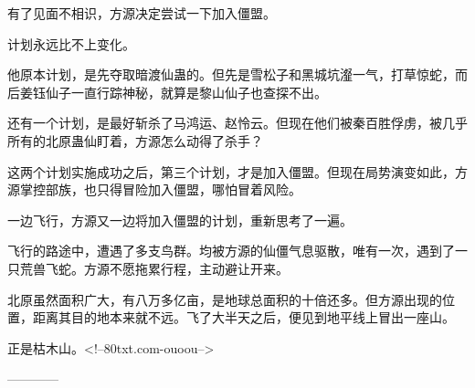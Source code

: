 \begin{this_body}
有了见面不相识，方源决定尝试一下加入僵盟。

计划永远比不上变化。

他原本计划，是先夺取暗渡仙蛊的。但先是雪松子和黑城坑瀣一气，打草惊蛇，而后姜钰仙子一直行踪神秘，就算是黎山仙子也查探不出。

还有一个计划，是最好斩杀了马鸿运、赵怜云。但现在他们被秦百胜俘虏，被几乎所有的北原蛊仙盯着，方源怎么动得了杀手？

这两个计划实施成功之后，第三个计划，才是加入僵盟。但现在局势演变如此，方源掌控部族，也只得冒险加入僵盟，哪怕冒着风险。

一边飞行，方源又一边将加入僵盟的计划，重新思考了一遍。

飞行的路途中，遭遇了多支鸟群。均被方源的仙僵气息驱散，唯有一次，遇到了一只荒兽飞蛇。方源不愿拖累行程，主动避让开来。

北原虽然面积广大，有八万多亿亩，是地球总面积的十倍还多。但方源出现的位置，距离其目的地本来就不远。飞了大半天之后，便见到地平线上冒出一座山。

正是枯木山。<!--80txt.com-ouoou-->

------------

\end{this_body}

